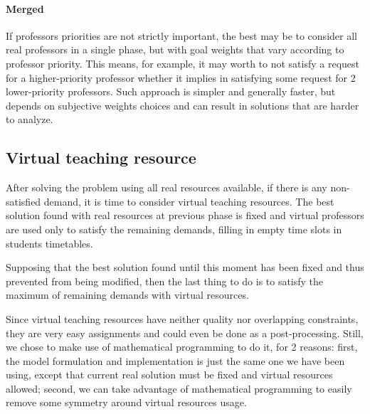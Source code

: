 \paragraph{Merged}
If professors priorities are not strictly important, the best may be to consider all real professors in a single phase, but with goal weights that vary according to professor priority. This means, for example, it may worth to not satisfy a request for a higher-priority professor whether it implies in satisfying some request for 2 lower-priority professors. Such approach is simpler and generally faster, but depends on subjective weights choices and can result in solutions that are harder to analyze.


\subsection{Virtual teaching resource}

After solving the problem using all real resources available, if there is any non-satisfied demand, it is time to consider virtual teaching resources. The best solution found with real resources at previous phase is fixed and virtual professors are used only to satisfy the remaining demands, filling in empty time slots in students timetables.



Supposing that the best solution found until this moment has been fixed and thus prevented from being modified, then the last thing to do is to satisfy the maximum of remaining demands with virtual resources. 

Since virtual teaching resources have neither quality nor overlapping constraints, they are very easy assignments and could even be done as a post-processing. Still, we chose to make use of mathematical programming to do it, for 2 reasons: first, the model formulation and implementation is just the same one we have been using, except that current real solution must be fixed and virtual resources allowed; second, we can take advantage of mathematical programming to easily remove some symmetry around virtual resources usage.

